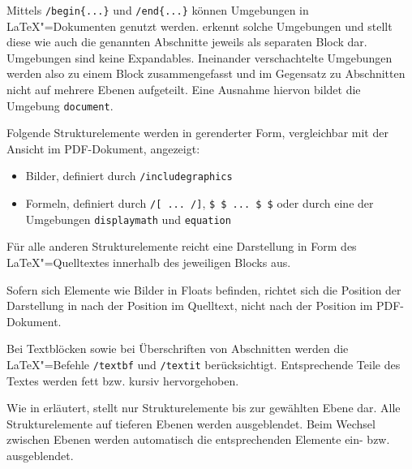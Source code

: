 \clearpage


Mittels \verb|/begin{...}| und \verb|/end{...}| können Umgebungen in \LaTeX"=Dokumenten genutzt werden.
\texla{} erkennt solche Umgebungen und stellt diese wie auch die genannten Abschnitte jeweils als separaten Block dar.
Umgebungen sind keine Expandables.
Ineinander verschachtelte Umgebungen werden also zu einem Block zusammengefasst und im Gegensatz zu Abschnitten nicht
auf mehrere Ebenen aufgeteilt.
Eine Ausnahme hiervon bildet die Umgebung \verb|document|.


Folgende Strukturelemente werden in gerenderter Form, vergleichbar mit der Ansicht im PDF-Dokument, angezeigt:

\begin{itemize}
\item Bilder, definiert durch \verb|/includegraphics|
  \item Formeln, definiert durch \verb|/[ ... /]|, \verb|$ $ ... $ $| oder durch eine der Umgebungen \verb|displaymath|
  und \verb|equation|

\end{itemize}
Für alle anderen Strukturelemente reicht eine Darstellung in Form des \LaTeX"=Quelltextes innerhalb des jeweiligen
Blocks aus.

Sofern sich Elemente wie Bilder in Floats befinden, richtet sich die Position der Darstellung in \texla{} nach der
Position im Quelltext, nicht nach der Position im PDF-Dokument.


Bei Textblöcken sowie bei Überschriften von Abschnitten werden die \LaTeX"=Befehle \verb|/textbf| und \verb|/textit|
berücksichtigt.
Entsprechende Teile des Textes werden fett bzw. kursiv hervorgehoben.


Wie in  erläutert, stellt \texla{} nur Strukturelemente bis zur gewählten Ebene dar.
Alle Strukturelemente auf tieferen Ebenen werden ausgeblendet.
Beim Wechsel zwischen Ebenen werden automatisch die entsprechenden Elemente ein- bzw. ausgeblendet.

